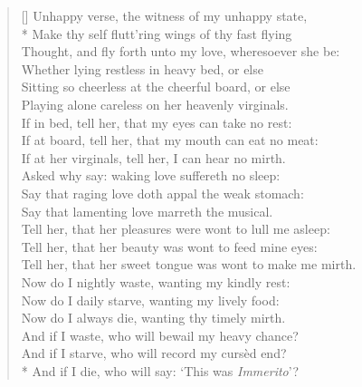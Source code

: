 \documentclass[MAIN]{subfiles}
\begin{document}
\settowidth{\versewidth}{\vin Tell her, that her sweet tongue was wont to make me mirth.}
\begin{verse}[\versewidth]
Unhappy verse, the witness of my unhappy state,\\*
\vin Make thy self flutt'ring wings of thy fast flying\\
\vin Thought, and fly forth unto my love, wheresoever she be:\\
Whether lying restless in heavy bed, or else\\
\vin Sitting so cheerless at the cheerful board, or else\\
\vin Playing alone careless on her heavenly virginals.\\
If in bed, tell her, that my eyes can take no rest:\\
\vin If at board, tell her, that my mouth can eat no meat:\\ 
\vin If at her virginals, tell her, I can hear no mirth.\\
Asked why say: waking love suffereth no sleep:\\
\vin Say that raging love doth appal the weak stomach:\\
\vin Say that lamenting love marreth the musical.\\
Tell her, that her pleasures were wont to lull me asleep:\\
\vin Tell her, that her beauty was wont to feed mine eyes:\\
\vin Tell her, that her sweet tongue was wont to make me mirth.\\
Now do I nightly waste, wanting my kindly rest:\\
\vin Now do I daily starve, wanting my lively food:\\
\vin Now do I always die, wanting thy timely mirth.\\
And if I waste, who will bewail my heavy chance?\\
\vin And if I starve, who will record my curs\`ed end?\\*
\vin And if I die, who will say: `This was \emph{Immerito}'?
\end{verse}
\end{document}
